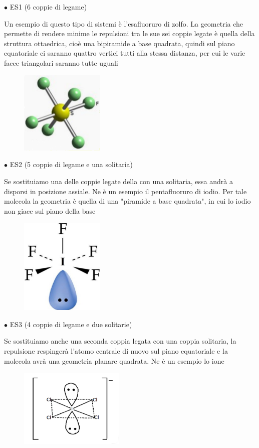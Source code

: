 $\bullet$ ES1  (6 coppie di legame)

Un esempio di questo tipo di sistemi è l'esafluoruro di zolfo. La geometria che permette di rendere minime le repulsioni tra le sue sei coppie legate è quella della struttura ottaedrica, cioè una bipiramide a base quadrata, quindi sul piano equatoriale ci saranno quattro vertici tutti alla stessa distanza, per cui le varie facce triangolari saranno tutte uguali

\begin{figure}[htp]
    \centering
    \includegraphics[width=4cm]{immagini/SF_6.png}
\end{figure}
$\bullet$ ES2  (5 coppie di legame e una solitaria)

Se sostituiamo una delle coppie legate della con una solitaria, essa andrà a disporsi in posizione assiale. Ne è un esempio il pentafluoruro di iodio. Per tale molecola la geometria è quella di una "piramide a base quadrata", in cui lo iodio non giace sul piano della base

\begin{figure}[htp]
    \centering
    \includegraphics[width=4cm]{immagini/IF_5.png}
\end{figure}

$\bullet$ ES3  (4 coppie di legame e due solitarie)

Se sostituiamo anche una seconda coppia legata con una coppia solitaria, la repulsione respingerà l'atomo centrale di nuovo sul piano equatoriale e la molecola avrà una geometria planare quadrata. Ne è un esempio lo ione 

\begin{figure}[htp]
    \centering
    \includegraphics[width=5cm]{immagini/ICl_4.png}
\end{figure}

